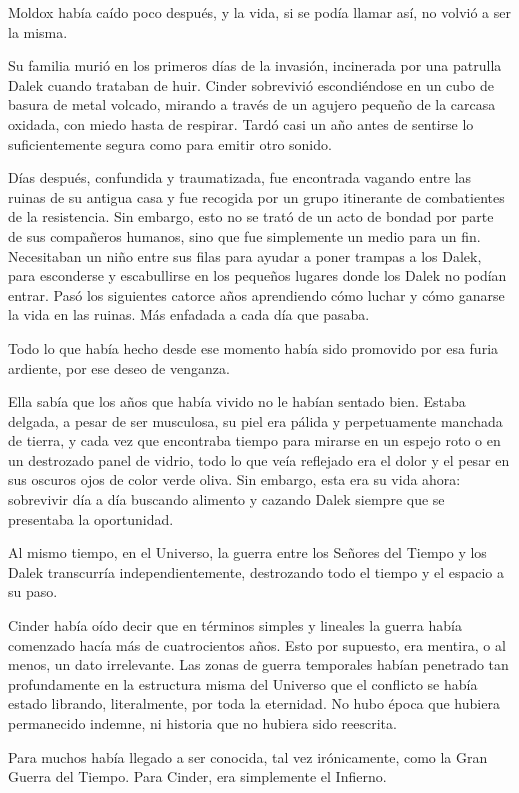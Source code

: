 Moldox había caído poco después, y la vida, si se podía llamar así, no volvió a ser la misma.

Su familia murió en los primeros días de la invasión, incinerada por una patrulla Dalek cuando trataban de huir. Cinder sobrevivió escondiéndose en un cubo de basura de metal volcado, mirando a través de un agujero pequeño de la carcasa oxidada, con miedo hasta de respirar. Tardó casi un año antes de sentirse lo suficientemente segura como para emitir otro sonido.

Días después, confundida y traumatizada, fue encontrada vagando entre las ruinas de su antigua casa y fue recogida por un grupo itinerante de combatientes de la resistencia. Sin embargo, esto no se trató de un acto de bondad por parte de sus compañeros humanos, sino que fue simplemente un medio para un fin. Necesitaban un niño entre sus filas para ayudar a poner trampas a los Dalek, para esconderse y escabullirse en los pequeños lugares donde los Dalek no podían entrar. Pasó los siguientes catorce años aprendiendo cómo luchar y cómo ganarse la vida en las ruinas. Más enfadada a cada día que pasaba.

Todo lo que había hecho desde ese momento había sido promovido por esa furia ardiente, por ese deseo de venganza.

Ella sabía que los años que había vivido no le habían sentado bien. Estaba delgada, a pesar de ser musculosa, su piel era pálida y perpetuamente manchada de tierra, y cada vez que encontraba tiempo para mirarse en un espejo roto o en un destrozado panel de vidrio, todo lo que veía reflejado era el dolor y el pesar en sus oscuros ojos de color verde oliva. Sin embargo, esta era su vida ahora: sobrevivir día a día buscando alimento y cazando Dalek siempre que se presentaba la oportunidad.

Al mismo tiempo, en el Universo, la guerra entre los Señores del Tiempo y los Dalek transcurría independientemente, destrozando todo el tiempo y el espacio a su paso.

Cinder había oído decir que en términos simples y lineales la guerra había comenzado hacía más de cuatrocientos años. Esto por supuesto, era mentira, o al menos, un dato irrelevante. Las zonas de guerra temporales habían penetrado tan profundamente en la estructura misma del Universo que el conflicto se había estado librando, literalmente, por toda la eternidad. No hubo época que hubiera permanecido indemne, ni historia que no hubiera sido reescrita.

Para muchos había llegado a ser conocida, tal vez irónicamente, como la Gran Guerra del Tiempo. Para Cinder, era simplemente el Infierno.

